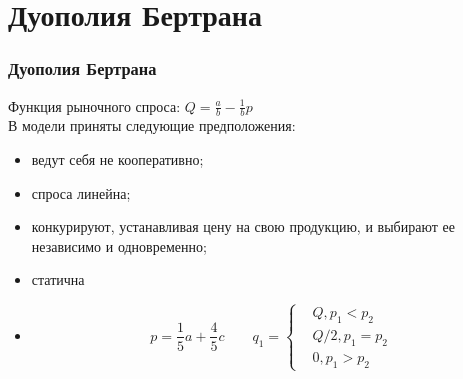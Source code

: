 \documentclass {beamer}
\begin{document}
\section{Дуополия Бертрана}
\begin{frame}

\frametitle{Дуополия Бертрана}
Функция рыночного спроса: $Q = \frac{a}{b}- \frac{1}{b}p$\\
В модели приняты следующие предположения: {\begin{itemize}\item {} ведут себя не кооперативно; 
\item {} спроса линейна; 
\item {} конкурируют, устанавливая цену на свою продукцию, и выбирают ее независимо и одновременно; 
\item {} статична\item \pause $$p=\frac{1}{5}a+\frac{4}{5}c\qquad q_1=\left\{ \begin{aligned} &Q, p_1<p_2 \\ &Q/2, p_1=p_2 \\& 0, p_1>p_2 \end{aligned}\right.$$
\end{itemize}}

\end{frame}
\end{document}
